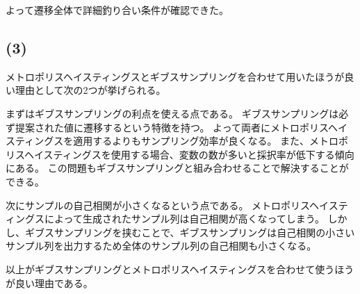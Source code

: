 よって遷移全体で詳細釣り合い条件が確認できた。

\subsection{(3)}
\hspace{1em}メトロポリスヘイスティングスとギブスサンプリングを合わせて用いたほうが良い理由として次の2つが挙げられる。

\hspace{1em}まずはギブスサンプリングの利点を使える点である。
ギブスサンプリングは必ず提案された値に遷移するという特徴を持つ。
よって両者にメトロポリスヘイスティングスを適用するよりもサンプリング効率が良くなる。
また、メトロポリスヘイスティングスを使用する場合、変数の数が多いと採択率が低下する傾向にある。
この問題もギブスサンプリングと組み合わせることで解決することができる。

\hspace{1em}次にサンプルの自己相関が小さくなるという点である。
メトロポリスヘイスティングスによって生成されたサンプル列は自己相関が高くなってしまう。
しかし、ギブスサンプリングを挟むことで、ギブスサンプリングは自己相関の小さいサンプル列を出力するため全体のサンプル列の自己相関も小さくなる。

\hspace{1em}以上がギブスサンプリングとメトロポリスヘイスティングスを合わせて使うほうが良い理由である。